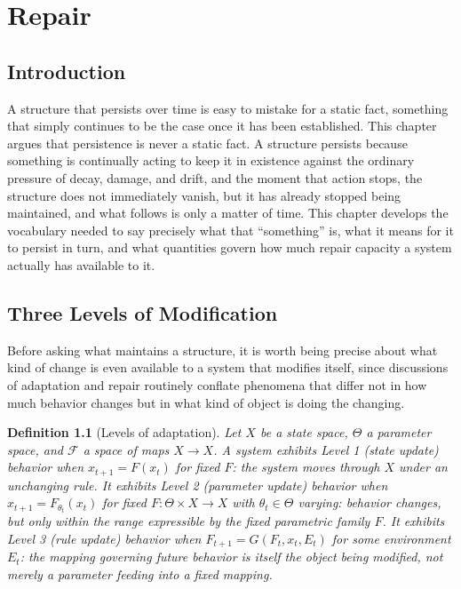 \documentclass[12pt]{report}
\newtheorem{definition}{Definition}[section]
\begin{document}
\chapter{Repair}

\section{Introduction}

A structure that persists over time is easy to mistake for a static
fact, something that simply continues to be the case once it has been
established. This chapter argues that persistence is never a static
fact. A structure persists because something is continually acting to
keep it in existence against the ordinary pressure of decay, damage, and
drift, and the moment that action stops, the structure does not
immediately vanish, but it has already stopped being maintained, and what
follows is only a matter of time. This chapter develops the vocabulary
needed to say precisely what that ``something'' is, what it means for it
to persist in turn, and what quantities govern how much repair capacity a
system actually has available to it.

\section{Three Levels of Modification}
\label{sec:levels}

Before asking what maintains a structure, it is worth being precise about
what kind of change is even available to a system that modifies itself,
since discussions of adaptation and repair routinely conflate phenomena
that differ not in how much behavior changes but in what kind of object
is doing the changing.

\begin{definition}[Levels of adaptation]
\label{def:levels}
Let $X$ be a state space, $\Theta$ a parameter space, and $\mathcal{F}$ a
space of maps $X \to X$. A system exhibits \emph{Level 1} (state update)
behavior when $x_{t+1} = F(x_t)$ for fixed $F$: the system moves through
$X$ under an unchanging rule. It exhibits \emph{Level 2} (parameter
update) behavior when $x_{t+1} = F_{\theta_t}(x_t)$ for fixed
$F : \Theta \times X \to X$ with $\theta_t \in \Theta$ varying: behavior
changes, but only within the range expressible by the fixed parametric
family $F$. It exhibits \emph{Level 3} (rule update) behavior when
$F_{t+1} = G(F_t, x_t, E_t)$ for some environment $E_t$: the mapping
governing future behavior is itself the object being modified, not merely
a parameter feeding into a fixed mapping.
\end{definition}
\end{document}
